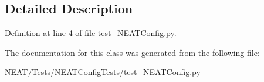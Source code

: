 \subsection{Detailed Description}


Definition at line 4 of file test\+\_\+\+N\+E\+A\+T\+Config.\+py.



The documentation for this class was generated from the following file\+:\begin{DoxyCompactItemize}
\item 
N\+E\+A\+T/\+Tests/\+N\+E\+A\+T\+Config\+Tests/test\+\_\+\+N\+E\+A\+T\+Config.\+py\end{DoxyCompactItemize}
